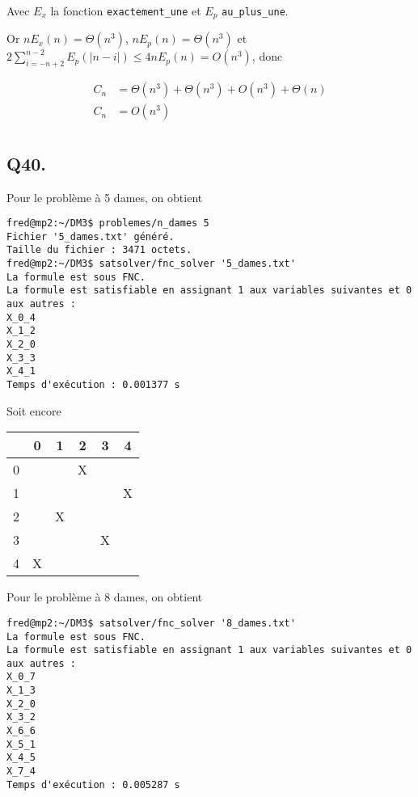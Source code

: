Avec $E_x$ la fonction \verb|exactement_une| et $E_p$ \verb|au_plus_une|.

Or $nE_x(n) = \Theta(n^3)$, $nE_p(n) = \Theta(n^3)$ et
$2\sum_{i=-n+2}^{n-2}E_p(|n-i|) \leq 4nE_p(n) = O(n^3)$, donc

\begin{align*}
    C_n &= \Theta(n^3) + \Theta(n^3) + O(n^3) +\Theta(n)\\
    C_n &= \boxed{O(n^3)}\\
\end{align*}

\subsection*{Q40.}
Pour le problème à 5 dames, on obtient

\begin{lstlisting}
fred@mp2:~/DM3$ problemes/n_dames 5
Fichier '5_dames.txt' généré.
Taille du fichier : 3471 octets.
fred@mp2:~/DM3$ satsolver/fnc_solver '5_dames.txt'
La formule est sous FNC.
La formule est satisfiable en assignant 1 aux variables suivantes et 0 aux autres :
X_0_4
X_1_2
X_2_0
X_3_3
X_4_1
Temps d'exécution : 0.001377 s
\end{lstlisting}

Soit encore
\begin{center}
    \begin{tabular}{| c || *{5}{c |}}
    \hline
      & 0 & 1 & 2 & 3 & 4 \\
    \hline
    \hline
    0 &   &   & X &   &   \\
    \hline
    1 &   &   &   &   & X \\
    \hline
    2 &   & X &   &   &   \\
    \hline
    3 &   &   &   & X &   \\
    \hline
    4 & X &   &   &   &   \\
    \hline
    \end{tabular}
\end{center}

Pour le problème à 8 dames, on obtient
\begin{lstlisting}
fred@mp2:~/DM3$ satsolver/fnc_solver '8_dames.txt'
La formule est sous FNC.
La formule est satisfiable en assignant 1 aux variables suivantes et 0 aux autres :
X_0_7
X_1_3
X_2_0
X_3_2
X_6_6
X_5_1
X_4_5
X_7_4
Temps d'exécution : 0.005287 s
\end{lstlisting}

